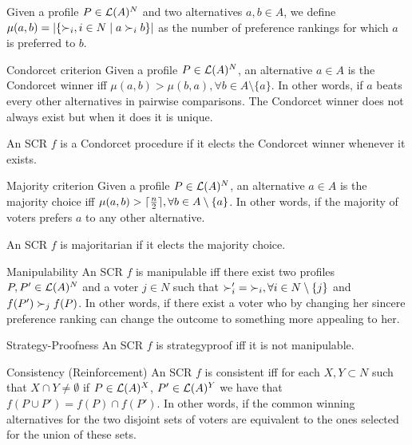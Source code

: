 	Given a profile $P\in\mathcal{L}(A)^{N}$ and two alternatives $a,b\in A$, we define $\mu(a,b)=|\{\mathbin{\prefi}, i \in N \suchthat a\prefi b\}|$ as the number of preference rankings for which $a$ is preferred to $b$. 

	\begin{genthm}{Condorcet criterion}
	Given a profile $P\in\mathcal{L}(A)^{N}$, an alternative $a\in A$ is the Condorcet winner iff $\mu(a,b)> \mu(b,a), \forall b\in{A\setminus{\{a\}}}$. In other words, if $a$ beats every other alternatives in pairwise comparisons. The Condorcet winner does not always exist but when it does it is unique.
	
	An \acs{SCR} $f$ is a Condorcet procedure if it elects the Condorcet winner whenever it exists.	
	\end{genthm}

	\begin{genthm}{Majority criterion}
	Given a profile $P\in\mathcal{L}(A)^{N}$, an alternative $a\in A$ is the majority choice iff $\mu(a,b)> \lceil\frac{n}{2}\rceil, \forall b\in{A\setminus{\{a\}}}$. In other words, if the majority of voters prefers $a$ to any other alternative.
	
	An \acs{SCR} $f$ is majoritarian if it elects the majority choice.
	\end{genthm}

	\begin{genthm}{Manipulability}
	An \acs{SCR} $f$ is manipulable iff there exist two profiles $P, P' \in\mathcal{L}(A)^{N}$ and a voter $j \in N$ such that $\mathbin{\pref}'_i=\mathbin{\prefi}, \forall i \in {N \setminus\{j\}}$ and $f(P') \succ_j f(P)$.
	In other words, if there exist a voter who by changing her sincere preference ranking can change the outcome to something more appealing to her.
	\end{genthm}

	\begin{genthm}{Strategy-Proofness}
		An \acs{SCR} $f$ is strategyproof iff it is not manipulable.
	\end{genthm}

	\begin{genthm}{Consistency (Reinforcement)}
		An \acs{SCR} $f$ is consistent iff for each $X,Y \subset N$ such that $X \cap Y \neq \emptyset$ if $P \in\mathcal{L}(A)^{X}$, $P' \in\mathcal{L}(A)^{Y}$ we have that $f(P \cup P')=f(P)\cap f(P')$. In other words, if the common winning alternatives for the two disjoint sets of voters are equivalent to the ones selected for the union of these sets.
	\end{genthm}

